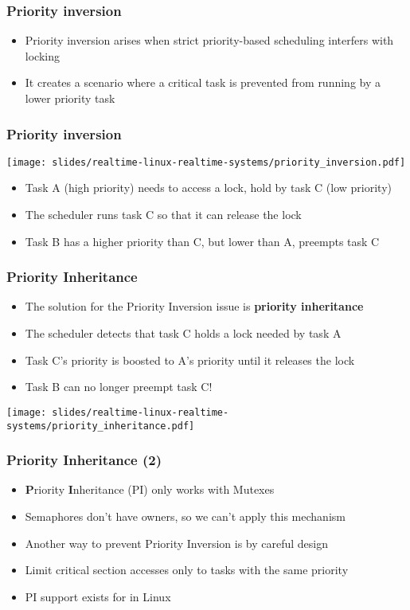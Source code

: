 \begin{frame}
  \frametitle{Priority inversion}
        \begin{itemize}
                \item Priority inversion arises when strict priority-based scheduling interfers with locking
                \item It creates a scenario where a critical task is
                      prevented from running by a lower priority task
        \end{itemize}
\end{frame}

\begin{frame}
  \frametitle{Priority inversion}
        \texttt{[image: slides/realtime-linux-realtime-systems/priority\_inversion.pdf]}
        \begin{itemize}
                \item Task A (high priority) needs to access a lock, hold by task C (low priority)
                \item The scheduler runs task C so that it can release the lock
                \item Task B has a higher priority than C, but lower than A, preempts task C
        \end{itemize}
\end{frame}

\begin{frame}
  \frametitle{Priority Inheritance}
        \begin{itemize}
                \item The solution for the Priority Inversion issue is \textbf{priority inheritance}
                \item The scheduler detects that task C holds a lock needed by task A
                \item Task C's priority is boosted to A's priority until it releases the lock
                \item Task B can no longer preempt task C!
        \end{itemize}
        \texttt{[image: slides/realtime-linux-realtime-systems/priority\_inheritance.pdf]}
\end{frame}

\begin{frame}
        \frametitle{Priority Inheritance (2)}
        \begin{itemize}
                \item \textbf{P}riority \textbf{I}nheritance (PI) only works with Mutexes
                \item Semaphores don't have owners, so we can't apply this mechanism
                \item Another way to prevent Priority Inversion is by careful design
                \item Limit critical section accesses only to tasks with the same priority
                \item PI support exists for  in Linux
        \end{itemize}
\end{frame}
